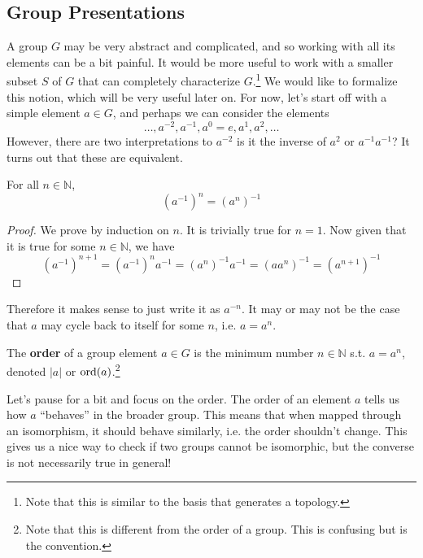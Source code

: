 \subsection{Group Presentations} 

  A group $G$ may be very abstract and complicated, and so working with all its elements can be a bit painful. It would be more useful to work with a smaller subset $S$ of $G$ that can completely characterize $G$.\footnote{Note that this is similar to the basis that generates a topology.} We would like to formalize this notion, which will be very useful later on. For now, let's start off with a simple element $a \in G$, and perhaps we can consider the elements 
  \begin{equation}
    \ldots, a^{-2}, a^{-1}, a^0 = e, a^1, a^2, \ldots
  \end{equation}
  However, there are two interpretations to $a^{-2}$ is it the inverse of $a^2$ or $a^{-1} a^{-1}$? It turns out that these are equivalent. 

  \begin{lemma}
    For all $n \in \mathbb{N}$, 
    \begin{equation}
      (a^{-1})^n = (a^n)^{-1}
    \end{equation}
  \end{lemma}
  \begin{proof}
    We prove by induction on $n$. It is trivially true for $n=1$. Now given that it is true for some $n \in \mathbb{N}$, we have 
    \begin{equation}
      (a^{-1})^{n+1} = (a^{-1})^n a^{-1} = (a^n)^{-1} a^{-1} = (a a^n)^{-1} = (a^{n+1})^{-1}
    \end{equation}
  \end{proof}

  Therefore it makes sense to just write it as $a^{-n}$. It may or may not be the case that $a$ may cycle back to itself for some $n$, i.e. $a = a^n$. 

  \begin{definition}
    The \textbf{order} of a group element $a \in G$ is the minimum number $n \in \mathbb{N}$ s.t. $a = a^n$, denoted $|a|$ or $\operatorname{ord}(a)$.\footnote{Note that this is different from the order of a group. This is confusing but is the convention. }
  \end{definition} 

  Let's pause for a bit and focus on the order. The order of an element $a$ tells us how $a$ ``behaves'' in the broader group. This means that when mapped through an isomorphism, it should behave similarly, i.e. the order shouldn't change. This gives us a nice way to check if two groups cannot be isomorphic, but the converse is not necessarily true in general! 

